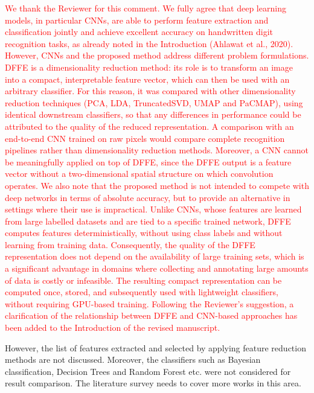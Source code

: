 \documentclass{ar2rc}
\begin{document}
\AR
\textcolor{red}{We thank the Reviewer for this comment. We fully agree that deep learning models, in particular CNNs, are able to perform feature extraction and classification jointly and achieve excellent accuracy on handwritten digit recognition tasks, as already noted in the Introduction (Ahlawat et al., 2020). However, CNNs and the proposed method address different problem formulations. DFFE is a dimensionality reduction method: its role is to transform an image into a compact, interpretable feature vector, which can then be used with an arbitrary classifier. For this reason, it was compared with other dimensionality reduction techniques (PCA, LDA, TruncatedSVD, UMAP and PaCMAP), using identical downstream classifiers, so that any differences in performance could be attributed to the quality of the reduced representation. A comparison with an end-to-end CNN trained on raw pixels would compare complete recognition pipelines rather than dimensionality reduction methods. Moreover, a CNN cannot be meaningfully applied on top of DFFE, since the DFFE output is a feature vector without a two-dimensional spatial structure on which convolution operates.
We also note that the proposed method is not intended to compete with deep networks in terms of absolute accuracy, but to provide an alternative in settings where their use is impractical. Unlike CNNs, whose features are learned from large labelled datasets and are tied to a specific trained network, DFFE computes features deterministically, without using class labels and without learning from training data. Consequently, the quality of the DFFE representation does not depend on the availability of large training sets, which is a significant advantage in domains where collecting and annotating large amounts of data is costly or infeasible. The resulting compact representation can be computed once, stored, and subsequently used with lightweight classifiers, without requiring GPU-based training. Following the Reviewer's suggestion, a clarification of the relationship between DFFE and CNN-based approaches has been added to the Introduction of the revised manuscript.}

\RC %
However, the list of features extracted and selected by applying feature reduction methods are not discussed. Moreover, the classifiers such as Bayesian classification, Decision Trees and Random Forest etc. were not considered for result comparison. The literature survey needs to cover more works in this area.
\end{document}
